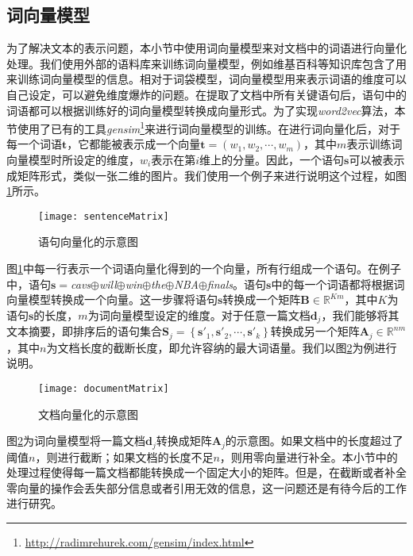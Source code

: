 \subsection{词向量模型}
\label{subsec3:word2vec}
为了解决文本的表示问题，本小节中使用词向量模型来对文档中的词语进行向量化处理。我们使用外部的语料库来训练词向量模型，例如维基百科等知识库包含了用来训练词向量模型的信息。相对于词袋模型，词向量模型用来表示词语的维度可以自己设定，可以避免维度爆炸的问题。在提取了文档中所有关键语句后，语句中的词语都可以根据训练好的词向量模型转换成向量形式。为了实现\textit{word2vec}算法，本节使用了已有的工具\textit{gensim}\footnote{\url{http://radimrehurek.com/gensim/index.html}}来进行词向量模型的训练。在进行词向量化后，对于每一个词语$\mathbf{t}$，它都能被表示成一个向量$\mathbf{t}=\left(w_1, w_2, \cdots, w_m\right)$，其中$m$表示训练词向量模型时所设定的维度，$w_i$表示在第$i$维上的分量。因此，一个语句$\mathbf{s}$可以被表示成矩阵形式，类似一张二维的图片。我们使用一个例子来进行说明这个过程，如图\ref{fig:senVec}所示。

\begin{figure}[!htbp]
  \centering
  \texttt{[image: sentenceMatrix]}
  \caption{语句向量化的示意图}
  \label{fig:senVec}
\end{figure}

图\ref{fig:senVec}中每一行表示一个词语向量化得到的一个向量，所有行组成一个语句。在例子中，语句$\mathbf{s}=$\textit{cavs}$\oplus$\textit{will}$\oplus$\textit{win}$\oplus$\textit{the}$\oplus$\textit{NBA}$\oplus$\textit{finals}。语句$\mathbf{s}$中的每一个词语都将根据词向量模型转换成一个向量。这一步骤将语句$\mathbf{s}$转换成一个矩阵$\mathbf{B} \in \mathbb{R}^{Km}$，其中$K$为语句$\mathbf{s}$的长度，$m$为词向量模型设定的维度。对于任意一篇文档$\mathbf{d}_j$，我们能够将其文本摘要，即排序后的语句集合$\mathbf{S}_j = \left\{\mathbf{s}'_1, \mathbf{s}'_2, \cdots, \mathbf{s}'_k\right\}$转换成另一个矩阵$\mathbf{A}_j \in \mathbb{R}^{nm}$，其中$n$为文档长度的截断长度，即允许容纳的最大词语量。我们以图\ref{fig:docVec}为例进行说明。

\begin{figure}[!htbp]
  \centering
  \texttt{[image: documentMatrix]}
  \caption{文档向量化的示意图}
  \label{fig:docVec}
\end{figure}

图\ref{fig:docVec}为词向量模型将一篇文档$\mathbf{d}_j$转换成矩阵$\mathbf{A}_j$的示意图。如果文档中的长度超过了阈值$n$，则进行截断；如果文档的长度不足$n$，则用零向量进行补全。本小节中的处理过程使得每一篇文档都能转换成一个固定大小的矩阵。但是，在截断或者补全零向量的操作会丢失部分信息或者引用无效的信息，这一问题还是有待今后的工作进行研究。

